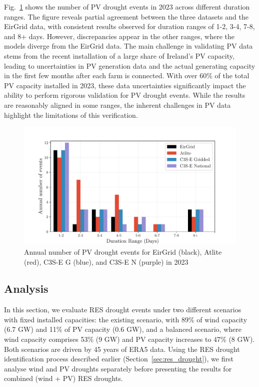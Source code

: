 \documentclass[a4paper, 11pt]{article}
\begin{document}
Fig.~\ref{fig:bar_number_events_verification_pv} shows the number of PV drought events in 2023 across different duration ranges. The figure reveals partial agreement between the three datasets and the EirGrid data, with consistent results observed for duration ranges of 1-2, 3-4, 7-8, and 8+ days. However, discrepancies appear in the other ranges, where the models diverge from the EirGrid data. The main challenge in validating PV data stems from the recent installation of a large share of Ireland’s PV capacity, leading to uncertainties in PV generation data and the actual generating capacity in the first few months after each farm is connected. With over 60\% of the total PV capacity installed in 2023, these data uncertainties significantly impact the ability to perform rigorous validation for PV drought events. While the results are reasonably aligned in some ranges, the inherent challenges in PV data highlight the limitations of this verification.

\begin{figure}[!ht]
	\centering
	\includegraphics[width=\textwidth]{verification_pv_bar}
	\caption{Annual number of PV drought events for EirGrid (black), Atlite (red), C3S-E G (blue), and C3S-E N (purple) in 2023}
	\label{fig:bar_number_events_verification_pv}
\end{figure}

\newpage
\subsection{Analysis}
\label{sec:Analysis}

In this section, we evaluate RES drought events under two different scenarios with fixed installed capacities: the existing scenario, with 89\% of wind capacity (6.7 GW) and 11\% of PV capacity (0.6 GW), and a balanced scenario, where wind capacity comprises 53\% (9 GW) and PV capacity increases to 47\% (8 GW). Both scenarios are driven by 45 years of ERA5 data. Using the RES drought identification process described earlier (Section~\ref{sec:res_drought}), we first analyse wind and PV droughts separately before presenting the results for combined (wind + PV) RES droughts.
\end{document}
